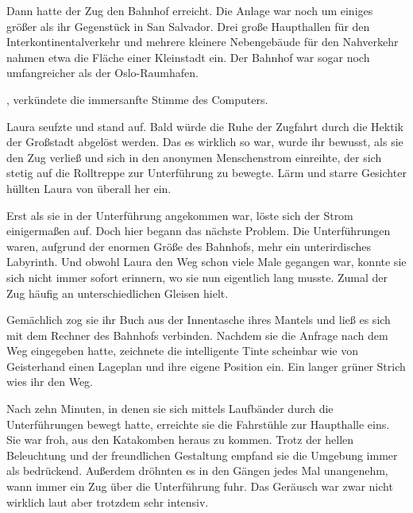 \par

Dann hatte der Zug den Bahnhof erreicht. Die Anlage war noch um einiges größer als ihr Gegenstück in San Salvador. Drei große Haupthallen für den Interkontinentalverkehr und mehrere kleinere Nebengebäude für den Nahverkehr nahmen etwa die Fläche einer Kleinstadt ein. Der Bahnhof war sogar noch umfangreicher als der Oslo-Raumhafen.

\par

, verkündete die immersanfte Stimme des Computers. 

\par

Laura seufzte und stand auf. Bald würde die Ruhe der Zugfahrt durch die Hektik der Großstadt abgelöst werden. Das es wirklich so war, wurde ihr bewusst, als sie den Zug verließ und sich in den anonymen Menschenstrom einreihte, der sich stetig auf die Rolltreppe zur Unterführung zu bewegte. Lärm und starre Gesichter hüllten Laura von überall her ein.

\par

Erst als sie in der Unterführung angekommen war, löste sich der Strom einigermaßen auf. Doch hier begann das nächste Problem. Die Unterführungen waren, aufgrund der enormen Größe des Bahnhofs, mehr ein unterirdisches Labyrinth. Und obwohl Laura den Weg schon viele Male gegangen war, konnte sie sich nicht immer sofort erinnern, wo sie nun eigentlich lang musste. Zumal der Zug häufig an unterschiedlichen Gleisen hielt.

\par

Gemächlich zog sie ihr Buch aus der Innentasche ihres Mantels und ließ es sich mit dem Rechner des Bahnhofs verbinden. Nachdem sie die Anfrage nach dem Weg eingegeben hatte, zeichnete die intelligente Tinte scheinbar wie von Geisterhand einen Lageplan und ihre eigene Position ein. Ein langer grüner Strich wies ihr den Weg.

\par

Nach zehn Minuten, in denen sie sich mittels Laufbänder durch die Unterführungen bewegt hatte, erreichte sie die Fahrstühle zur Haupthalle eins. Sie war froh, aus den Katakomben heraus zu kommen. Trotz der hellen Beleuchtung und der freundlichen Gestaltung empfand sie die Umgebung immer als bedrückend. Außerdem dröhnten es in den Gängen jedes Mal unangenehm, wann immer ein Zug über die Unterführung fuhr. Das Geräusch war zwar nicht wirklich laut aber trotzdem sehr intensiv.

